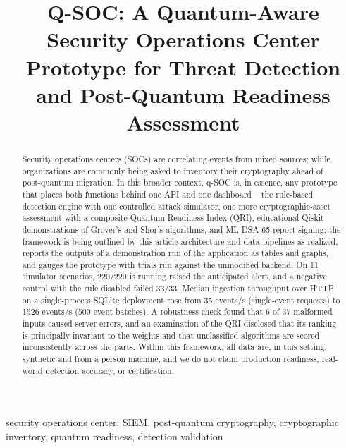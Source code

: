 \documentclass[conference]{IEEEtran}
\begin{document}
\title{Q-SOC: A Quantum-Aware Security Operations Center Prototype for Threat Detection and Post-Quantum Readiness Assessment}

\author{
}

\maketitle

\begin{abstract}
Security operations centers (SOCs) are correlating events from mixed sources; while organizations are commonly being asked to inventory their cryptography ahead of post-quantum migration. In this broader context, q-SOC is, in essence, any prototype that places both functions behind one API and one dashboard -- the rule-based detection engine with one controlled attack simulator, one more cryptographic-asset assessment with a composite Quantum Readiness Index (QRI), educational Qiskit demonstrations of Grover's and Shor's algorithms, and ML-DSA-65 report signing; the framework is being outlined by this article architecture and data pipelines as realized, reports the outputs of a demonstration run of the application as tables and graphs, and gauges the prototype with trials run against the unmodified backend. On 11 simulator scenarios, 220/220 is running raised the anticipated alert, and a negative control with the rule disabled failed 33/33. Median ingestion throughput over HTTP on a single-process SQLite deployment rose from 35 events/s (single-event requests) to 1526 events/s (500-event batches). A robustness check found that 6 of 37 malformed inputs caused server errors, and an examination of the QRI disclosed that its ranking is principally invariant to the weights and that unclassified algorithms are scored inconsistently across the parts. Within this framework, all data are, in this setting, synthetic and from a person machine, and we do not claim production readiness, real-world detection accuracy, or certification.
\end{abstract}

\begin{IEEEkeywords}
security operations center, SIEM, post-quantum cryptography, cryptographic inventory, quantum readiness, detection validation
\end{IEEEkeywords}
\end{document}
